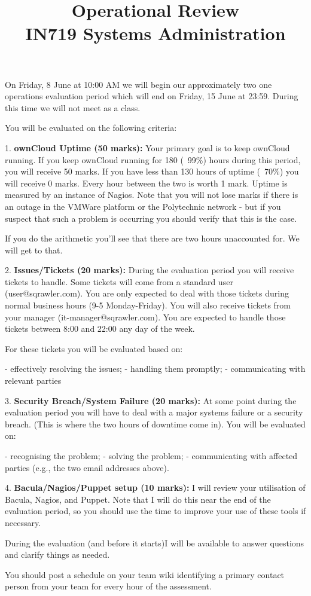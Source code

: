 \documentclass{article}   	%
\title{Operational Review\\ IN719 Systems Administration}
\date{}							%
\begin{document}
\maketitle


On Friday, 8 June at 10:00 AM we will begin our approximately two one operations evaluation period which will end on Friday, 15 June at 23:59.  During this time we will not meet as a class.

You will be evaluated on the following criteria:

1.  \textbf{ownCloud Uptime (50 marks):}  Your primary goal is to keep ownCloud running.  If you keep ownCloud running for 180 (~99\%) hours during this period, you will receive 50 marks.  If you have less than 130 hours of uptime (~70\%) you will receive 0 marks.  Every hour between the two is worth 1 mark.  Uptime is measured by an instance of Nagios.  Note that you will not lose marks if there is an outage in the VMWare platform or the Polytechnic network - but if you suspect that such a problem is occurring you should verify that this is the case.

If you do the arithmetic you'll see that there are two hours unaccounted for.  We will get to that.

2.  \textbf{Issues/Tickets (20 marks):}  During the evaluation period you will receive tickets to handle.  Some tickets will come from a standard user (user@sqrawler.com).  You are only expected to deal with those tickets during normal business hours (9-5 Monday-Friday).  You will also receive tickets from your manager (it-manager@sqrawler.com).  You are expected to handle those tickets between 8:00 and 22:00 any day of the week.  

For these tickets you will be evaluated based on:

   - effectively resolving the issues;
   - handling them promptly;
   - communicating with relevant parties

3.  \textbf{Security Breach/System Failure (20 marks):}  At some point during the evaluation period you will have to deal with a major systems failure or a security breach.  (This is where the two hours of downtime come in).  You will be evaluated on:

  - recognising the problem;
  - solving the problem;
  - communicating with affected parties (e.g., the two email addresses above).

4.  \textbf{Bacula/Nagios/Puppet setup (10 marks):} I will review your utilisation of Bacula, Nagios, and Puppet.  Note that I will do this near the end of the evaluation period, so you should use the time to improve your use of these tools if necessary.

During the evaluation (and before it starts)I will be available to answer questions and clarify things as needed.

You should post a schedule on your team wiki identifying a primary contact person from your team for every hour of the assessment.
\end{document}
